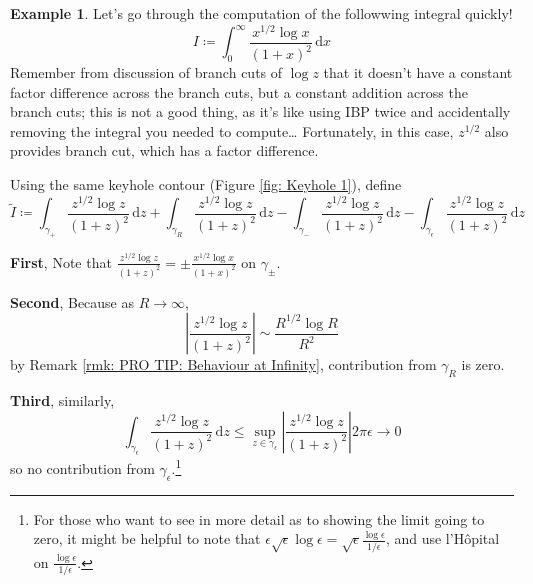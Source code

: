 \documentclass[a4paper, 12pt]{article}
\theoremstyle{definition}
\newtheorem{example}{Example}
\numberwithin{theorem}{section}
\numberwithin{definition}{section}
\numberwithin{exercise}{section}
\numberwithin{remark}{section}
\numberwithin{figure}{section}
\numberwithin{example}{section}
\newcommand{\intd}{\,\text{d}}
\begin{document}
\begin{example}
    Let's go through the computation of the followwing integral quickly!
    \begin{equation*}
        I \coloneqq \int_{0}^{\infty} \frac{x^{1/2} \log x}{\left( 1+x \right)^2} \intd x
    \end{equation*}
    Remember from discussion of branch cuts of $\log z$ that it doesn't have a constant factor difference across the branch cuts, but a constant addition across the branch cuts;
    this is not a good thing, as it's like using IBP twice and accidentally removing the integral you needed to compute\dots
    Fortunately, in this case, $z^{1/2}$ also provides branch cut, which has a factor difference.

    Using the same keyhole contour (Figure \ref{fig: Keyhole 1}),
    define
    \begin{equation*}
        \tilde I \coloneqq
        \int_{\gamma_+} \frac{z^{1/2} \log z}{\left( 1+z \right)^2} \intd z
        +
        \int_{\gamma_R} \frac{z^{1/2} \log z}{\left( 1+z \right)^2} \intd z
        -
        \int_{\gamma_-} \frac{z^{1/2} \log z}{\left( 1+z \right)^2} \intd z
        -
        \int_{\gamma_\epsilon} \frac{z^{1/2} \log z}{\left( 1+z \right)^2} \intd z
    \end{equation*}

    \textbf{First},
    Note that $\frac{z^{1/2} \log z}{\left( 1+z \right)^2} = \pm \frac{x^{1/2} \log x}{\left( 1+x \right)^2}$ on $\gamma_{\pm}$.

    \textbf{Second},
    Because as $R \rightarrow \infty$,
    \begin{equation*}
        \left| \frac{z^{1/2} \log z}{\left( 1+z \right)^2} \right|
        \sim
        \frac{R^{1/2} \log R}{ R^2}
    \end{equation*}
    by Remark \ref{rmk: PRO TIP: Behaviour at Infinity},
    contribution from $\gamma_R$ is zero.

    \textbf{Third},
    similarly,
    \begin{equation*}
        \int_{\gamma_\epsilon} \frac{z^{1/2} \log z}{\left( 1+z \right)^2} \intd z
        \leq
        \sup_{z \in \gamma_{\epsilon}} \left|\frac{z^{1/2} \log z}{\left( 1+z \right)^2}\right| 2\pi \epsilon
        \rightarrow 0
    \end{equation*}
    so no contribution from $\gamma_\epsilon$.\footnote{For those who want to see in more detail as to showing the limit going to zero, it might be helpful to note that $\epsilon \sqrt{\epsilon} \log \epsilon = \sqrt{\epsilon} \frac{\log \epsilon}{1/\epsilon}$, and use l'H\^opital on $\frac{\log \epsilon}{1/\epsilon}$.}


\end{example}
\end{document}
